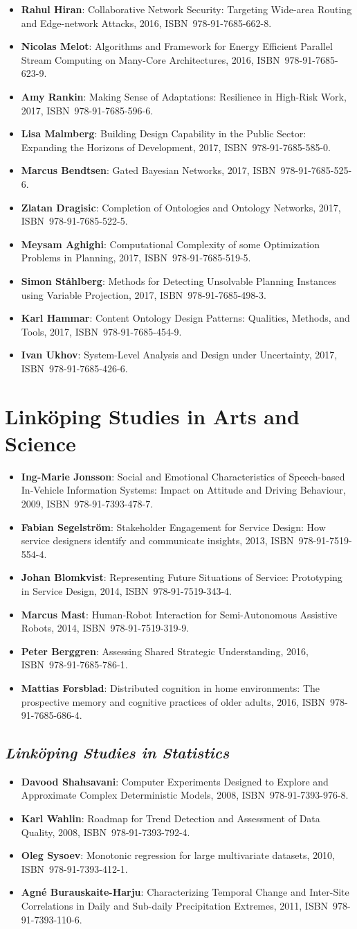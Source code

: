 \documentclass[a4paper,showtrims,twocolumn]{memoir}
\newcommand{\series}[1]{\section*{\footnotesize #1}}
\newcommand{\subseries}[1]{\subsection*{\footnotesize\normalfont\textit{#1}}}
\newenvironment{theses}{
  \begin{itemize}
    \setlength{\itemsep}{0.2em}
    \setlength{\parskip}{0em}
    \setlength{\parsep}{0em}
}{
  \end{itemize}
}
\newcommand{\thesis}[5]{\item[No. #1] \textbf{#2}: #3, #4, ISBN~#5.}
\begin{document}
\begin{theses}
    \thesis{1798}{Rahul Hiran}{Collaborative Network Security: Targeting Wide-area Routing and Edge-network Attacks}{2016}{978-91-7685-662-8}
    \thesis{1813}{Nicolas Melot}{Algorithms and Framework for Energy Efficient Parallel Stream Computing on Many-Core Architectures}{2016}{978-91-7685-623-9}
    \thesis{1823}{Amy Rankin}{Making Sense of Adaptations: Resilience in High-Risk Work}{2017}{978-91-7685-596-6}
    \thesis{1831}{Lisa Malmberg}{Building Design Capability in the Public Sector: Expanding the Horizons of Development}{2017}{978-91-7685-585-0}
    \thesis{1851}{Marcus Bendtsen}{Gated Bayesian Networks}{2017}{978-91-7685-525-6}
    \thesis{1852}{Zlatan Dragisic}{Completion of Ontologies and Ontology Networks}{2017}{978-91-7685-522-5}
    \thesis{1854}{Meysam Aghighi}{Computational Complexity of some Optimization Problems in Planning}{2017}{978-91-7685-519-5}
    \thesis{1863}{Simon Ståhlberg}{Methods for Detecting Unsolvable Planning Instances using Variable Projection}{2017}{978-91-7685-498-3}
    \thesis{1879}{Karl Hammar}{Content Ontology Design Patterns: Qualities, Methods, and Tools}{2017}{978-91-7685-454-9}
    \thesis{1887}{Ivan Ukhov}{System-Level Analysis and Design under Uncertainty}{2017}{978-91-7685-426-6}
  \end{theses}

  \series{Linköping Studies in Arts and Science}

  \begin{theses}
    \thesis{504}{Ing-Marie Jonsson}{Social and Emotional Characteristics of Speech-based In-Vehicle Information Systems: Impact on Attitude and Driving Behaviour}{2009}{978-91-7393-478-7}
    \thesis{586}{Fabian Segelström}{Stakeholder Engagement for Service Design: How service designers identify and communicate insights}{2013}{978-91-7519-554-4}
    \thesis{618}{Johan Blomkvist}{Representing Future Situations of Service: Prototyping in Service Design}{2014}{978-91-7519-343-4}
    \thesis{620}{Marcus Mast}{Human-Robot Interaction for Semi-Autonomous Assistive Robots}{2014}{978-91-7519-319-9}
    \thesis{677}{Peter Berggren}{Assessing Shared Strategic Understanding}{2016}{978-91-7685-786-1}
    \thesis{695}{Mattias Forsblad}{Distributed cognition in home environments: The prospective memory and cognitive practices of older adults}{2016}{978-91-7685-686-4}
  \end{theses}

  \subseries{Linköping Studies in Statistics}

  \begin{theses}
    \thesis{9}{Davood Shahsavani}{Computer Experiments Designed to Explore and Approximate Complex Deterministic Models}{2008}{978-91-7393-976-8}
    \thesis{10}{Karl Wahlin}{Roadmap for Trend Detection and Assessment of Data Quality}{2008}{978-91-7393-792-4}
    \thesis{11}{Oleg Sysoev}{Monotonic regression for large multivariate datasets}{2010}{978-91-7393-412-1}
    \thesis{13}{Agné Burauskaite-Harju}{Characterizing Temporal Change and Inter-Site Correlations in Daily and Sub-daily Precipitation Extremes}{2011}{978-91-7393-110-6}
  \end{theses}
\end{document}
